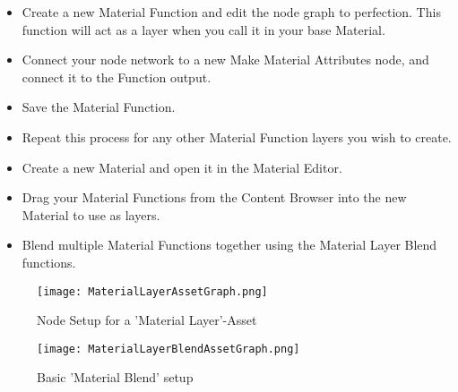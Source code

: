         \begin{itemize}
            \item Create a new Material Function and edit the node graph to perfection. This function will act as a layer when you call it in your base Material.
            \item Connect your node network to a new Make Material Attributes node, and connect it to the Function output.
            \item Save the Material Function.
            \item Repeat this process for any other Material Function layers you wish to create.
            \item Create a new Material and open it in the Material Editor.
            \item Drag your Material Functions from the Content Browser into the new Material to use as layers.
            \item Blend multiple Material Functions together using the Material Layer Blend functions. 
        \end{itemize}

        \begin{figure}
            \texttt{[image: MaterialLayerAssetGraph.png]}
            \caption{Node Setup for a 'Material Layer'-Asset}
        \end{figure}

        \begin{figure}
            \texttt{[image: MaterialLayerBlendAssetGraph.png]}
            \caption{Basic 'Material Blend' setup}
        \end{figure}


